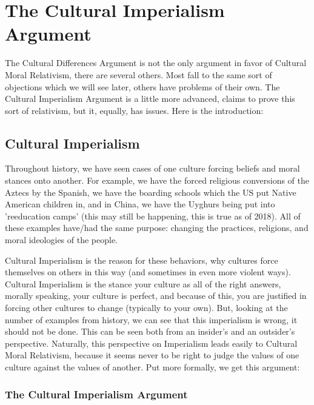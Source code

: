 \section{The Cultural Imperialism Argument}

The Cultural Differences Argument is not the only argument in favor of Cultural Moral Relativism, there are several others. Most fall to the same sort of objections which we will see later, others have problems of their own. The Cultural Imperialism Argument is a little more advanced, claims to prove this sort of relativism, but it, equally, has issues.  Here is the introduction:

\subsection{Cultural Imperialism}

Throughout history, we have seen cases of one culture forcing beliefs and moral stances onto another. For example, we have the forced religious conversions of the Aztecs by the Spanish, we have the boarding schools which the US put Native American children in, and in China, we have the Uyghurs being put into 'reeducation camps' (this may still be happening, this is true as of 2018). All of these examples have/had the same purpose: changing the practices, religions, and moral ideologies of the people.  

Cultural Imperialism is the reason for these behaviors, why cultures force themselves on others in this way (and sometimes in even more violent ways). Cultural Imperialism is the stance your culture as all of the right answers, morally speaking, your culture is perfect, and because of this, you are justified in forcing other cultures to change (typically to your own). But, looking at the number of examples from history, we can see that this imperialism is wrong, it should not be done. This can be seen both from an insider's and an outsider's perspective. Naturally, this perspective on Imperialism leads easily to Cultural Moral Relativism, because it seems never to be right to judge the values of one culture against the values of another. Put more formally, we get this argument:

\subsubsection{The Cultural Imperialism Argument}

